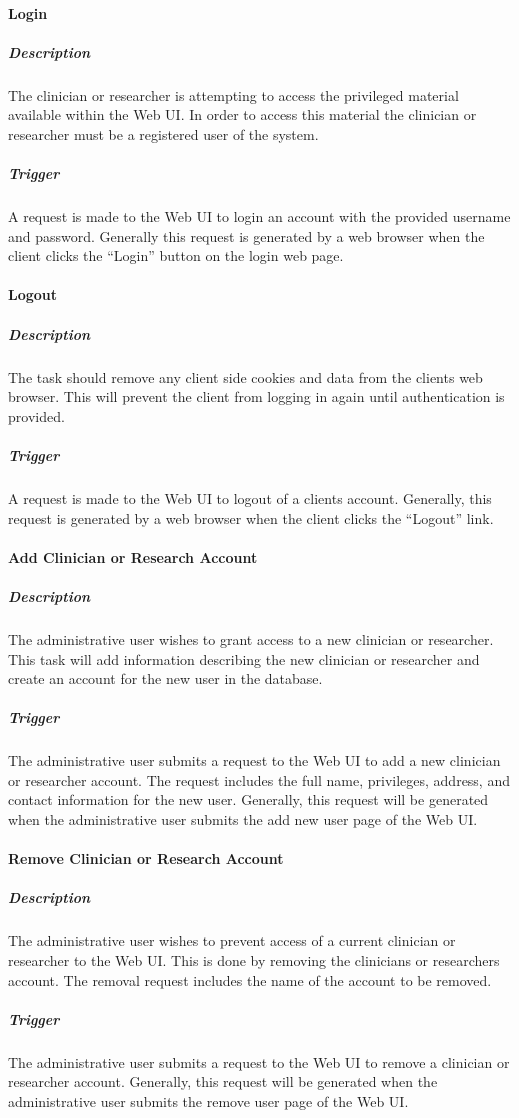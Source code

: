 \documentclass{article}
\begin{document}
\paragraph{Login}
\subparagraph{Description}
The clinician or researcher is attempting to access the privileged material available within the Web UI. In order to access this material the clinician or researcher must be a registered user of the system.
\subparagraph{Trigger}
A request is made to the Web UI to login an account with the provided username and password. Generally this request is generated by a web browser when the client clicks the ``Login'' button on the login web page.

\paragraph{Logout}
\subparagraph{Description}
The task should remove any client side cookies and data from the clients web browser. This will prevent the client from logging in again until authentication is provided.
\subparagraph{Trigger}
A request is made to the Web UI to logout of a clients account. Generally, this request is generated by a web browser when the client clicks the ``Logout'' link.

\paragraph{Add Clinician or Research Account}
\subparagraph{Description}
The administrative user wishes to grant access to a new clinician or researcher. This task will add information describing the new clinician or researcher and create an account for the new user in the database.
\subparagraph{Trigger}
The administrative user submits a request to the Web UI to add a new clinician or researcher account. The request includes the full name, privileges, address, and contact information for the new user. Generally, this request will be generated when the administrative user submits the add new user page of the Web UI.

\paragraph{Remove Clinician or Research Account}
\subparagraph{Description}
The administrative user wishes to prevent access of a current clinician or researcher to the Web UI. This is done by removing the clinicians or researchers account. The removal request includes the name of the account to be removed.
\subparagraph{Trigger}
The administrative user submits a request to the Web UI to remove a clinician or researcher account. Generally, this request will be generated when the administrative user submits the remove user page of the Web UI.
\end{document}
